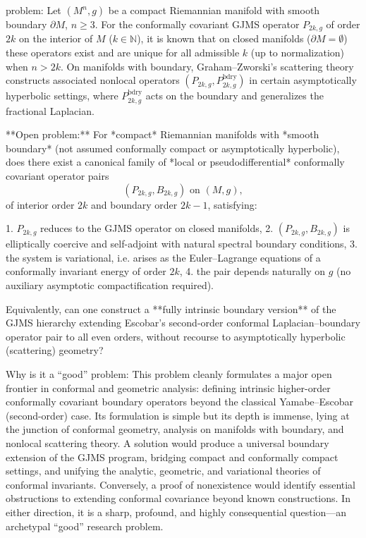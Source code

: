 problem:  
Let \((M^n, g)\) be a compact Riemannian manifold with smooth boundary \(\partial M\), \(n \ge 3\).  
For the conformally covariant GJMS operator \(P_{2k,g}\) of order \(2k\) on the interior of \(M\) (\(k \in \mathbb{N}\)), it is known that on closed manifolds (\(\partial M = \emptyset\)) these operators exist and are unique for all admissible \(k\) (up to normalization) when \(n>2k\). On manifolds with boundary, Graham–Zworski’s scattering theory constructs associated nonlocal operators \((P_{2k,g}, P_{2k,g}^{\text{bdry}})\) in certain asymptotically hyperbolic settings, where \(P_{2k,g}^{\text{bdry}}\) acts on the boundary and generalizes the fractional Laplacian.  

**Open problem:**  
For *compact* Riemannian manifolds with *smooth boundary* (not assumed conformally compact or asymptotically hyperbolic), does there exist a canonical family of *local or pseudodifferential* conformally covariant operator pairs
\[
(P_{2k,g}, B_{2k,g}) \text{ on } (M,g),
\]
of interior order \(2k\) and boundary order \(2k-1\), satisfying:

1. \(P_{2k,g}\) reduces to the GJMS operator on closed manifolds,  
2. \((P_{2k,g}, B_{2k,g})\) is elliptically coercive and self-adjoint with natural spectral boundary conditions,  
3. the system is variational, i.e. arises as the Euler–Lagrange equations of a conformally invariant energy of order \(2k\),  
4. the pair depends naturally on \(g\) (no auxiliary asymptotic compactification required).

Equivalently, can one construct a **fully intrinsic boundary version** of the GJMS hierarchy extending Escobar’s second-order conformal Laplacian–boundary operator pair to all even orders, without recourse to asymptotically hyperbolic (scattering) geometry?  

Why is it a “good” problem:  
This problem cleanly formulates a major open frontier in conformal and geometric analysis: defining intrinsic higher-order conformally covariant boundary operators beyond the classical Yamabe–Escobar (second-order) case. Its formulation is simple but its depth is immense, lying at the junction of conformal geometry, analysis on manifolds with boundary, and nonlocal scattering theory. A solution would produce a universal boundary extension of the GJMS program, bridging compact and conformally compact settings, and unifying the analytic, geometric, and variational theories of conformal invariants. Conversely, a proof of nonexistence would identify essential obstructions to extending conformal covariance beyond known constructions. In either direction, it is a sharp, profound, and highly consequential question—an archetypal “good” research problem.